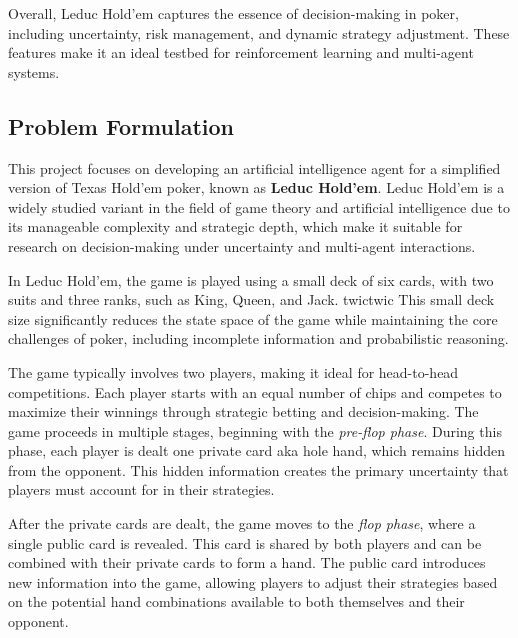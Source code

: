 \documentclass{article}
\begin{document}
Overall, Leduc Hold'em captures the essence of decision-making in poker, including uncertainty, risk management, and dynamic strategy adjustment. These features make it an ideal testbed for reinforcement learning and multi-agent systems.

\subsection{Problem Formulation}
This project focuses on developing an artificial intelligence agent for a simplified version of Texas Hold'em poker, known as \textbf{Leduc Hold'em}. Leduc Hold'em is a widely studied variant in the field of game theory and artificial intelligence due to its manageable complexity and strategic depth, which make it suitable for research on decision-making under uncertainty and multi-agent interactions.

In Leduc Hold'em, the game is played using a small deck of six cards, with two suits and three ranks, such as King, Queen, and Jack. twictwic This small deck size significantly reduces the state space of the game while maintaining the core challenges of poker, including incomplete information and probabilistic reasoning.

The game typically involves two players, making it ideal for head-to-head competitions. Each player starts with an equal number of chips and competes to maximize their winnings through strategic betting and decision-making. The game proceeds in multiple stages, beginning with the \textit{pre-flop phase}. During this phase, each player is dealt one private card aka hole hand, which remains hidden from the opponent. This hidden information creates the primary uncertainty that players must account for in their strategies.

After the private cards are dealt, the game moves to the \textit{flop phase}, where a single public card is revealed. This card is shared by both players and can be combined with their private cards to form a hand. The public card introduces new information into the game, allowing players to adjust their strategies based on the potential hand combinations available to both themselves and their opponent.
\end{document}
